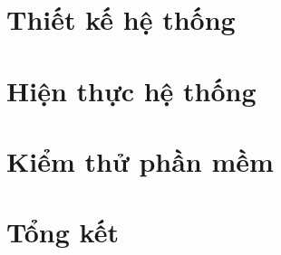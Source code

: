 \documentclass[a4paper, oneside, 12pt]{report}
\theoremstyle{definition}
\begin{document}

\chapter{Thiết kế hệ thống}


\newpage


\newpage


\newpage


\newpage





\chapter{Hiện thực hệ thống}


\newpage



\newpage


\newpage



\chapter{Kiểm thử phần mềm}



\chapter{Tổng kết}







\end{document}
